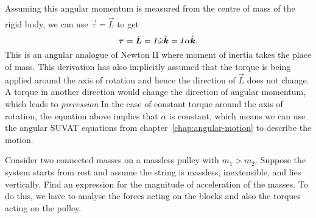 \documentclass[../classical_mechanics.tex]{subfiles}
\begin{document}
        Assuming this angular momentum is measured from the centre of mass of the rigid body, we can use $\vec{\tau}=\dot{\vec{L}}$ to get
        \begin{equation}
            \boldsymbol{\tau}=\dot{\boldsymbol{L}}=I\dot{\omega}\hat{\boldsymbol{k}}=I\alpha\hat{\boldsymbol{k}}.
        \end{equation}
        This is an angular analogue of Newton II where moment of inertia takes the place of mass.
        This derivation has also implicitly assumed that the torque is being applied around the axis of rotation and hence the direction of $\vec{L}$ does not change.
        A torque in another direction would change the direction of angular momentum, which leads to \textit{precession}
        In the case of constant torque around the axis of rotation, the equation above implies that $\alpha$ is constant, which means we can use the angular SUVAT equations from chapter~\ref{chap:angular-motion} to describe the motion. 
        \begin{example}
            Consider two connected masses on a massless pulley with $m_1>m_2$.
            Suppose the system starts from rest and assume the string is massless, inextensible, and lies vertically.
            Find an expression for the magnitude of acceleration of the masses.
            To do this, we have to analyse the forces acting on the blocks and also the torques acting on the pulley.
        \end{example}

\end{document}
